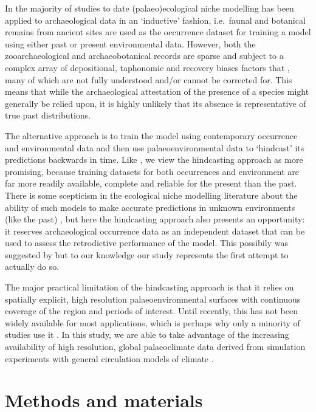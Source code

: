 \documentclass[
  authoryear,
  review]{elsarticle}
\begin{document}
In the majority of studies to date (palaeo)ecological niche modelling
has been applied to archaeological data in an `inductive' fashion,
i.e.~faunal and botanical remains from ancient sites are used as the
occurrence dataset for training a model using either past or present
environmental data. However, both the zooarchaeological and
archaeobotanical records are sparse and subject to a complex array of
depositional, taphonomic and recovery biases factors that , many of
which are not fully understood and/or cannot be corrected for. This
means that while the archaeological attestation of the presence of a
species might generally be relied upon, it is highly unlikely that its
absence is representative of true past distributions.

The alternative approach is to train the model using contemporary
occurrence and environmental data and then use palaeoenvironmental data
to `hindcast' its predictions backwards in time. Like
\citet{FranklinEtAl2015}, we view the hindcasting approach as more
promising, because training datasets for both occurrences and
environment are far more readily available, complete and reliable for
the present than the past. There is some scepticism in the ecological
niche modelling literature about the ability of such models to make
accurate predictions in unknown environments (like the past)
\citep{CITES}, but here the hindcasting approach also presents an
opportunity: it reserves archaeological occurrence data as an
independent dataset that can be used to assess the retrodictive
performance of the model. This possibily was suggested by
\citet{FranklinEtAl2015} but to our knowledge our study represents the
first attempt to actually do so.

The major practical limitation of the hindcasting approach is that it
relies on spatially explicit, high resolution palaeoenvironmental
surfaces with continuous coverage of the region and periods of interest.
Until recently, this has not been widely available for most
applications, which is perhaps why only a minority of studies use it
\citep[cf.][]{YaworskyEtAl2023}. In this study, we are able to take
advantage of the increasing availability of high resolution, global
palaeoclimate data derived from simulation experiments with general
circulation models of climate
\citep{BrownEtAl2018, BrownEtAl2020, KargerEtAl2023}.

\section{Methods and materials}\label{methods-and-materials}
\end{document}
